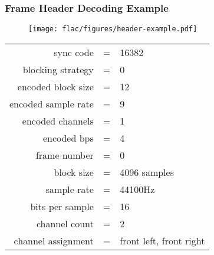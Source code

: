 \subsubsection{Frame Header Decoding Example}
\begin{figure}[h]
\texttt{[image: flac/figures/header-example.pdf]}
\end{figure}
{
\begin{tabular}{rcl}
\textsf{sync code} & = & 16382 \\
\textsf{blocking strategy} & = & 0 \\
\textsf{encoded block size} & = & 12 \\
\textsf{encoded sample rate} & = & 9 \\
\textsf{encoded channels} & = & 1 \\
\textsf{encoded bps} & = & 4 \\
\textsf{frame number} & = & 0 \\
\textsf{block size} & = & 4096 samples \\
\textsf{sample rate} & = & 44100Hz \\
\textsf{bits per sample} & = & 16 \\
\textsf{channel count} & = & 2 \\
\textsf{channel assignment} & = & front left, front right
\end{tabular}
}
